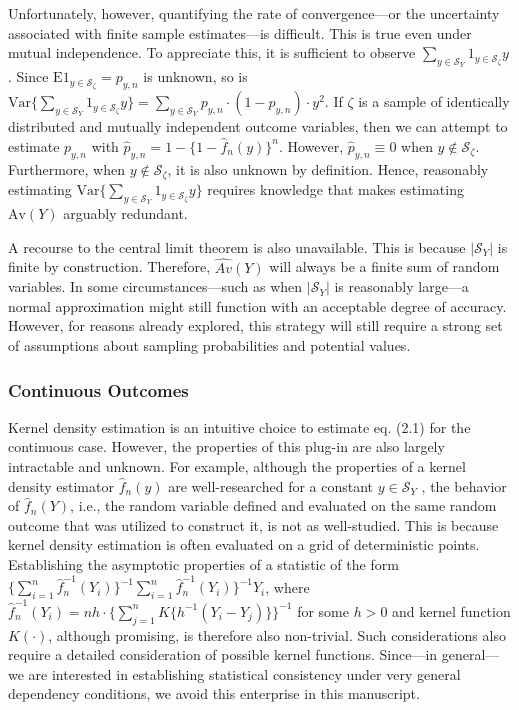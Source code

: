 \documentclass[12pt]{amsart}
\theoremstyle{plain}%
\theoremstyle{definition}
\theoremstyle{remark}
\numberwithin{equation}{section}
\begin{document}
Unfortunately, however, quantifying the rate of convergence---or the uncertainty associated with finite sample estimates---is difficult. This is true even under mutual independence. To appreciate this, it is sufficient to observe $\sum_{y \in \mathcal{S}_Y} 1_{y \in \mathcal{S}_{\zeta}} y$. Since $\text{E} 1_{y \in \mathcal{S}_{\zeta}} = p_{y, n}$ is unknown, so is $\text{Var} \{ \sum_{y \in \mathcal{S}_Y} 1_{y \in \mathcal{S}_{\zeta}} y \} = \sum_{y \in \mathcal{S}_Y} p_{y, n} \cdot (1-p_{y, n}) \cdot y^2$. If $\zeta$ is a sample of identically distributed and mutually independent outcome variables, then we can attempt to estimate $p_{y, n}$ with $\hat{p}_{y, n} = 1-\{ 1-\hat{f}_n (y) \}^n$. However, $\hat{p}_{y, n} \equiv 0$ when $y \notin \mathcal{S}_{\zeta}$. Furthermore, when $y \notin \mathcal{S}_{\zeta}$, it is also unknown by definition. Hence, reasonably estimating  $\text{Var} \{ \sum_{y \in \mathcal{S}_Y} 1_{y \in \mathcal{S}_{\zeta}} y \}$ requires knowledge that makes estimating $\text{Av}(Y)$ arguably redundant.

A recourse to the central limit theorem is also unavailable. This is because $|\mathcal{S}_Y|$ is finite by construction. Therefore, $\hat{Av}(Y)$ will always be a finite sum of random variables. In some circumstances---such as when $|\mathcal{S}_Y|$ is reasonably large---a normal approximation might still function with an acceptable degree of accuracy. However, for reasons already explored, this strategy will still require a strong set of assumptions about sampling probabilities and potential values. 

\subsubsection{Continuous Outcomes}

Kernel density estimation is an intuitive choice to estimate eq. (2.1) for the continuous case. However, the properties of this plug-in are also largely intractable and unknown. For example, although the properties of a kernel density estimator $\hat{f}_n (y)$ are well-researched for a constant $y \in \mathcal{S}_Y$ \cite{hansen2008uniform, chen2017tutorial, zambom2013review}, the behavior of  $\hat{f}_n (Y)$, i.e., the random variable defined and evaluated on the same random outcome that was utilized to construct it, is not as well-studied. This is because kernel density estimation is often evaluated on a grid of deterministic points. Establishing the asymptotic properties of a statistic of the form $\{ \sum_{i=1}^n \hat{f}_n^{-1} (Y_i) \}^{-1} \sum_{i=1}^n \hat{f}_n^{-1} (Y_i) \}^{-1} Y_i $, where $\hat{f}_n^{-1} (Y_i) = nh \cdot  \{ \sum_{j=1}^n K\{h^{-1} (Y_i - Y_j) \} \}^{-1}$ for some $h > 0$ and kernel function $K(\cdot)$, although promising, is therefore also non-trivial. Such considerations also require a detailed consideration of possible kernel functions. Since---in general---we are interested in establishing statistical consistency under very general dependency conditions, we avoid this enterprise in this manuscript.
\end{document}
